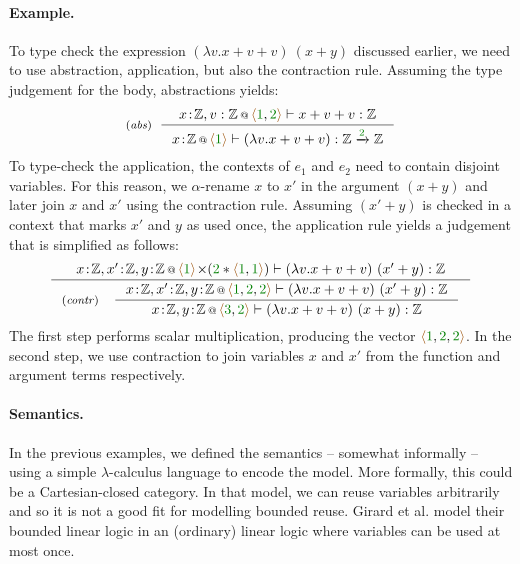 \paragraph{Example.} To type check the expression $(\lambda v.x+v+v)~(x+y)$ discussed earlier, we need
to use abstraction, application, but also the contraction rule. Assuming the type judgement for the body,
abstractions yields:
%
\begin{equation*}
\tyrule{abs}
 { \coctx{x\!:\!\mathbb{Z},v:\mathbb{Z}}{\alift{\cclrd{1},\cclrd{2}}} \vdash x+v+v : \mathbb{Z} }
 { \coctx{x\!:\!\mathbb{Z}}{\alift{\cclrd{1}}} \vdash (\lambda v.x+v+v) : \mathbb{Z} \xrightarrow{\cclrd{2}} \mathbb{Z} }
\end{equation*}
%
To type-check the application, the contexts of $e_1$ and $e_2$ need to contain disjoint variables.
For this reason, we $\alpha$-rename $x$ to $x'$ in the argument $(x+y)$ and later join $x$ and $x'$ using
the contraction rule. Assuming $(x'+y)$ is checked in a context that marks $x'$ and $y$ as used once, the
application rule yields a judgement that is simplified as follows:
%
\begin{equation*}
\inference
  { \coctx{x\!:\!\mathbb{Z},x'\!:\!\mathbb{Z},y\!:\!\mathbb{Z}}
          {\alift{\cclrd{1}} \cons (\cclrd{2} \ast \alift{\cclrd{1},\cclrd{1}}) } \vdash (\lambda v.x+v+v)~(x'+y) : \mathbb{Z} }
{\tyrule{contr}
  { \coctx{x\!:\!\mathbb{Z},x'\!:\!\mathbb{Z},y\!:\!\mathbb{Z}}{\alift{\cclrd{1}, \cclrd{2}, \cclrd{2}} } \vdash (\lambda v.x+v+v)~(x'+y) : \mathbb{Z} }
  { \coctx{x\!:\!\mathbb{Z},y\!:\!\mathbb{Z}}{\alift{\cclrd{3}, \cclrd{2}}} \vdash (\lambda v.x+v+v)~(x+y)  : \mathbb{Z}} }
\end{equation*}
%
The first step performs scalar multiplication, producing the vector
$\alift{\cclrd{1},\cclrd{2},\cclrd{2}}$. In the second step, we use contraction to join variables
$x$ and $x'$ from the function and argument terms respectively.


\paragraph{Semantics.}
In the previous examples, we defined the semantics -- somewhat informally -- using a simple
$\lambda$-calculus language to encode the model. More formally, this could be a Cartesian-closed
category. In that model, we can reuse variables arbitrarily and so it is not
a good fit for modelling bounded reuse. Girard et al. \cite{logic-bounded} model their bounded
linear logic in an (ordinary) linear logic where variables can be used at most once.

